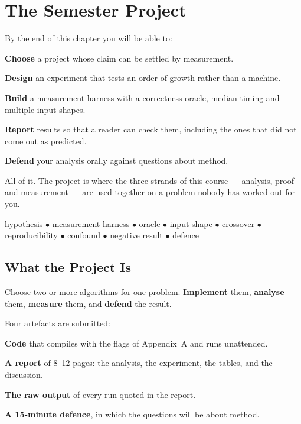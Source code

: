\chapter{The Semester Project}\label{ch:project}

\begin{outcomes}
By the end of this chapter you will be able to:
\begin{tight}
  \item \textbf{Choose} a project whose claim can be settled by measurement.
  \item \textbf{Design} an experiment that tests an order of growth rather than
        a machine.
  \item \textbf{Build} a measurement harness with a correctness oracle, median
        timing and multiple input shapes.
  \item \textbf{Report} results so that a reader can check them, including the
        ones that did not come out as predicted.
  \item \textbf{Defend} your analysis orally against questions about method.
\end{tight}
\end{outcomes}

\begin{prereq}
All of it. The project is where the three strands of this course --- analysis,
proof and measurement --- are used together on a problem nobody has worked out
for you.
\end{prereq}

\begin{keyterms}
hypothesis $\bullet$ measurement harness $\bullet$ oracle $\bullet$ input
shape $\bullet$ crossover $\bullet$ reproducibility $\bullet$ confound
$\bullet$ negative result $\bullet$ defence
\end{keyterms}

\section{What the Project Is}

\begin{definitionbox}
Choose two or more algorithms for one problem. \textbf{Implement} them,
\textbf{analyse} them, \textbf{measure} them, and \textbf{defend} the result.

\smallskip
Four artefacts are submitted:
\begin{tight}
  \item \textbf{Code} that compiles with the flags of Appendix~A and runs
        unattended.
  \item \textbf{A report} of 8--12 pages: the analysis, the experiment, the
        tables, and the discussion.
  \item \textbf{The raw output} of every run quoted in the report.
  \item \textbf{A 15-minute defence}, in which the questions will be about
        method.
\end{tight}
\end{definitionbox}

